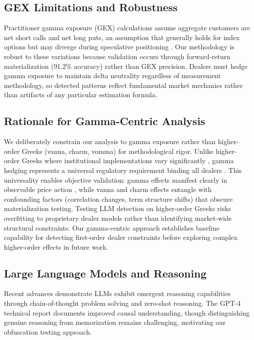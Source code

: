\subsection{GEX Limitations and Robustness}

Practitioner gamma exposure (GEX) calculations assume aggregate customers are net short calls and net long puts, an assumption that generally holds for index options but may diverge during speculative positioning \cite{krishnan2021market}. Our methodology is robust to these variations because validation occurs through forward-return materialization (91.2\% accuracy) rather than GEX precision. Dealers must hedge gamma exposure to maintain delta neutrality regardless of measurement methodology, so detected patterns reflect fundamental market mechanics rather than artifacts of any particular estimation formula.

\subsection{Rationale for Gamma-Centric Analysis}
\label{sec:gamma-focus}

We deliberately constrain our analysis to gamma exposure rather than higher-order Greeks (vanna, charm, vomma) for methodological rigor. Unlike higher-order Greeks where institutional implementations vary significantly \cite{ederington2007,mixon2009}, gamma hedging represents a universal regulatory requirement binding all dealers \cite{mixon2009,pearson2013}. This universality enables objective validation: gamma effects manifest clearly in observable price action \cite{ni2022}, while vanna and charm effects entangle with confounding factors (correlation changes, term structure shifts) that obscure materialization testing. Testing LLM detection on higher-order Greeks risks overfitting to proprietary dealer models rather than identifying market-wide structural constraints. Our gamma-centric approach establishes baseline capability for detecting first-order dealer constraints before exploring complex higher-order effects in future work.

\subsection{Large Language Models and Reasoning}

Recent advances demonstrate LLMs exhibit emergent reasoning capabilities through chain-of-thought problem solving and zero-shot reasoning. The GPT-4 technical report \cite{openai2023gpt4} documents improved causal understanding, though distinguishing genuine reasoning from memorization remains challenging, motivating our obfuscation testing approach.

